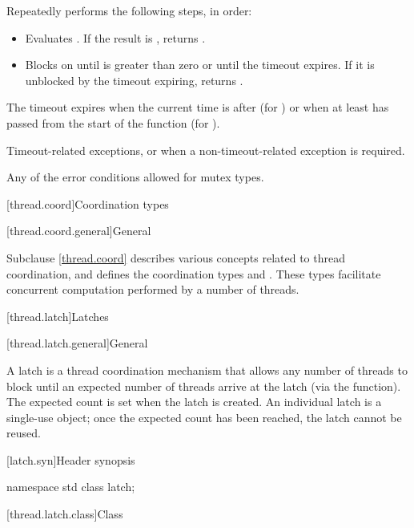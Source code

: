\begin{itemdescr}
\pnum
\effects
Repeatedly performs the following steps, in order:
\begin{itemize}
\item
  Evaluates .
  If the result is , returns .
\item
  Blocks on 
  until  is greater than zero or until the timeout expires.
  If it is unblocked by the timeout expiring, returns .
\end{itemize}
The timeout expires
when the current time is after  (for )
or when at least  has passed
from the start of the function (for ).

\pnum
\throws
Timeout-related exceptions, or 
when a non-timeout-related exception is required.

\pnum
\errors
Any of the error conditions
allowed for mutex types.
\end{itemdescr}

[thread.coord]{Coordination types}

[thread.coord.general]{General}

\pnum
Subclause \ref{thread.coord} describes various concepts related to thread coordination, and
defines the coordination types  and .
These types facilitate concurrent computation performed by a number of threads.

[thread.latch]{Latches}

[thread.latch.general]{General}

\pnum
A latch is a thread coordination mechanism
that allows any number of threads to block
until an expected number of threads arrive at the latch
(via the  function).
The expected count is set when the latch is created.
An individual latch is a single-use object;
once the expected count has been reached, the latch cannot be reused.

[latch.syn]{Header  synopsis}

%
\begin{codeblock}
namespace std {
  class latch;
}
\end{codeblock}

[thread.latch.class]{Class }

